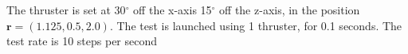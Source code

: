 The thruster is set at 30$^\circ$ off the x-axis 15$^\circ$ off the z-axis, in the position $\bm r = \left(1.125,0.5,2.0\right)$. The test is launched using 1 thruster, for 0.1 seconds. The test rate is 10 steps per second